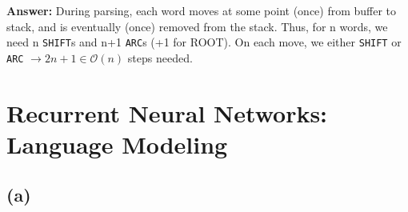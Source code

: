\documentclass[11pt]{article}
\begin{document}
\textbf{Answer:} During parsing, each word moves at some point (once) from buffer to stack, and is eventually (once) removed from the stack. Thus, for n words, we need n \verb|SHIFT|s and n+1 \verb|ARC|s (+1 for ROOT). On each move, we either \verb|SHIFT| or \verb|ARC| $\to 2n+1 \in \mathcal{O}(n)$ steps needed.

\section{Recurrent Neural Networks: Language Modeling}
\subsection*{(a)}
\end{document}
